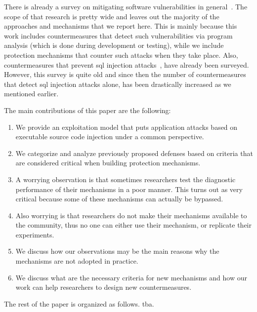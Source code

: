 \documentclass[conference]{IEEEtran}
\begin{document}
There is already a survey on mitigating software vulnerabilities
in general~\cite{SZ12}. The scope of that
research is pretty wide and leaves out the majority of the
approaches and mechanisms that we report here.
This is mainly because this work includes countermeasures
that detect such vulnerabilities via program analysis
(which is done during development or testing), while
we include protection mechanisms that counter
such attacks when they take place.
Also, countermeasures that prevent {\sc sql}
injection attacks~\cite{HVO06}, have already been surveyed.
However, this survey is quite old and since then
the number of countermeasures that detect {\sc sql}
injection attacks alone, has been drastically increased
as we mentioned earlier.

The main contributions of this paper are the following:

\begin{enumerate}
\item We provide an exploitation model that puts application attacks
  based on executable source code injection under a common
  perspective.
\item We categorize and analyze previously proposed defenses based on
  criteria that are considered critical when building protection
  mechanisms.
\item A worrying observation is that sometimes researchers test the
  diagnostic performance of their mechanisms in a poor manner. This
  turns out as very critical because some of these mechanisms can
  actually be bypassed.
\item Also worrying is that researchers do not make their mechanisms
  available to the community, thus no one can either use their
  mechanism, or replicate their experiments.
\item We discuss how our observations may be the main reasons why the
  mechanisms are not adopted in practice.
\item We discuss what are the necessary criteria for new mechanisms
  and how our work can help researchers to design new countermeasures.
\end{enumerate}

The rest of the paper is organized as follows. {\sc tba}.

\end{document}
